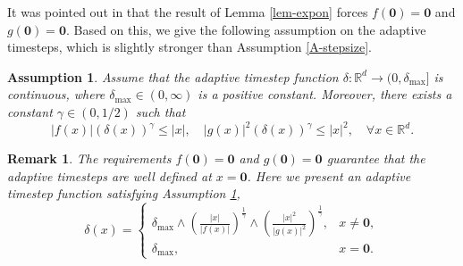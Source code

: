 \documentclass[preprint,12pt,compress]{elsarticle}
\newtheorem{assumption}[theorem]{Assumption}
\newtheorem{remark}[theorem]{Remark}
\begin{document}
It was pointed out in \cite[p. 299]{higham2003exponential} that the result of Lemma \ref{lem-expon} forces $f(\mathbf{0}) = \mathbf{0}$ and $g(\mathbf{0}) = \mathbf{0}$. Based on this, we give the following assumption on the adaptive timesteps, which is slightly stronger than Assumption \ref{A-stepsize}.

\begin{assumption}  \label{A-stability}
Assume that the adaptive timestep function $\delta: \mathbb{R}^d \to (0, \delta_{\max}]$ is continuous, where $\delta_{\max} \in (0, \infty)$ is a positive constant. Moreover, there exists a constant $\gamma \in (0, 1/2)$ such that
\begin{equation*}
	\left| {f(x)} \right|{\left( {\delta (x)} \right)^\gamma } \le \left| x \right|,\quad \left| {g(x)} \right|^2{\left( {\delta (x)} \right)^\gamma } \le {\left| x \right|^2}, \quad \forall x \in \mathbb{R}^d.
\end{equation*}
\end{assumption}

\begin{remark}
The requirements $f(\mathbf{0}) = \mathbf{0}$ and $g(\mathbf{0}) = \mathbf{0}$ guarantee that the adaptive timesteps are well defined at $x = \mathbf{0}$.
Here we present an adaptive timestep function satisfying Assumption \ref{A-stability},
\begin{equation*}
	\delta(x)
	=
	\begin{cases}
		\displaystyle
		\delta_{\max}
		\wedge
		\left(\frac{\lvert x\rvert}{\lvert f(x)\rvert}\right)^{\frac{1}{\gamma}}
		\wedge
		\left(\frac{\lvert x\rvert^{2}}{\lvert g(x)\rvert^{2}}\right)^{\frac{1}{\gamma}},
		& x\neq \mathbf{0}, \\[1.2ex]
		\delta_{\max},
		& x=\mathbf{0}.
	\end{cases}
\end{equation*}


\end{remark}
\end{document}
